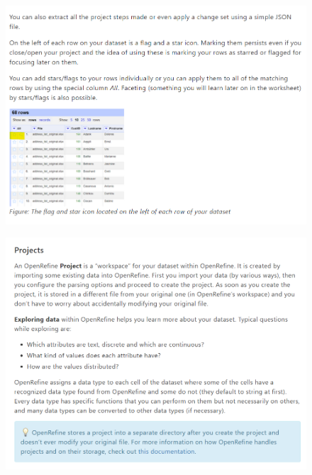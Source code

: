 \begin{figure}[H]
    \includegraphics[width=\linewidth]{./Figures/Appendices/worksheet/8.png}
\end{figure}
\begin{figure}[H]
    \includegraphics[width=\linewidth]{./Figures/Appendices/worksheet/9.png}
\end{figure}
